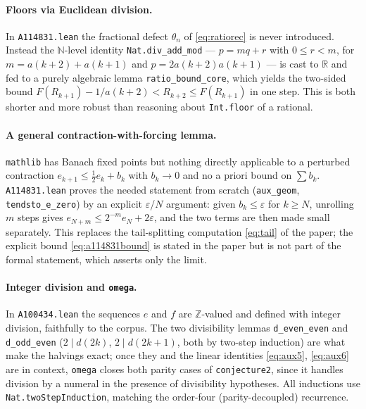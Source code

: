\documentclass[11pt]{article}
\theoremstyle{plain}
\theoremstyle{definition}
\theoremstyle{remark}
\numberwithin{equation}{section}
\newcommand{\N}{\mathbb{N}}
\newcommand{\Z}{\mathbb{Z}}
\newcommand{\R}{\mathbb{R}}
\begin{document}
\paragraph{Floors via Euclidean division.}
In \texttt{A114831.lean} the fractional defect $\theta_n$ of \eqref{eq:ratiorec} is never
introduced. Instead the $\N$-level identity \texttt{Nat.div\_add\_mod} --- $p = m q + r$ with
$0 \le r < m$, for $m = a(k{+}2)+a(k{+}1)$ and $p = 2a(k{+}2)a(k{+}1)$ --- is cast to $\R$ and fed
to a purely algebraic lemma \texttt{ratio\_bound\_core}, which yields the two-sided bound
$F(R_{k+1}) - 1/a(k{+}2) < R_{k+2} \le F(R_{k+1})$ in one step. This is both shorter and more
robust than reasoning about \texttt{Int.floor} of a rational.

\paragraph{A general contraction-with-forcing lemma.}
\texttt{mathlib} has Banach fixed points but nothing directly applicable to a perturbed
contraction $e_{k+1} \le \tfrac12 e_k + b_k$ with $b_k \to 0$ and no a priori bound on
$\sum b_k$. \texttt{A114831.lean} proves the needed statement from scratch
(\texttt{aux\_geom}, \texttt{tendsto\_e\_zero}) by an explicit $\varepsilon$/$N$ argument: given
$b_k \le \varepsilon$ for $k \ge N$, unrolling $m$ steps gives
$e_{N+m} \le 2^{-m} e_N + 2\varepsilon$, and the two terms are then made small separately. This
replaces the tail-splitting computation \eqref{eq:tail} of the paper; the explicit bound
\eqref{eq:a114831bound} is stated in the paper but is not part of the formal statement, which
asserts only the limit.

\paragraph{Integer division and \texttt{omega}.}
In \texttt{A100434.lean} the sequences $e$ and $f$ are $\Z$-valued and defined with integer
division, faithfully to the corpus. The two divisibility lemmas \texttt{d\_even\_even} and
\texttt{d\_odd\_even} ($2 \mid d(2k)$, $2 \mid d(2k+1)$, both by two-step induction) are what make
the halvings exact; once they and the linear identities \eqref{eq:aux5}, \eqref{eq:aux6} are in
context, \texttt{omega} closes both parity cases of \texttt{conjecture2}, since it handles
division by a numeral in the presence of divisibility hypotheses. All inductions use
\texttt{Nat.twoStepInduction}, matching the order-four (parity-decoupled) recurrence.
\end{document}
